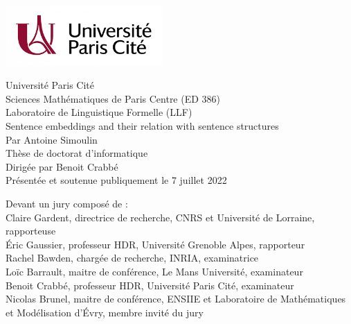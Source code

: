 \vspace{0.1cm}
\includegraphics[width=6cm]{images/paris-cité.png}

\huge
Université Paris Cité\\[0.1cm]
\large 
Sciences Mathématiques de Paris Centre (ED 386)\\[0.1cm]
Laboratoire de Linguistique Formelle (LLF)\\[2cm]

\Huge
Sentence embeddings and their relation with sentence structures\\[2cm]

\LARGE 
\textmd{Par Antoine Simoulin\\[2cm]
\Large
Thèse de doctorat d’informatique\\[1cm]
Dirigée par Benoit Crabbé \\[1cm]
\large 
Présentée et soutenue publiquement le 7 juillet 2022\\[1cm]}

\raggedright\large 
\textmd{Devant un jury composé de : \\[0.2cm]
\normalsize
Claire Gardent, directrice de recherche, CNRS et Université de Lorraine, rapporteuse\\
Éric Gaussier, professeur HDR, Université Grenoble Alpes, rapporteur\\
Rachel Bawden, chargée de recherche, INRIA, examinatrice\\
Loïc Barrault, maitre de conférence, Le Mans Université, examinateur\\
Benoit Crabbé, professeur HDR, Université Paris Cité, examinateur\\
Nicolas Brunel, maitre de conférence, ENSIIE et Laboratoire de Mathématiques et Modélisation d'Évry, membre invité du jury\\}